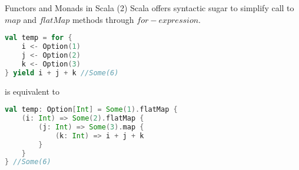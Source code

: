 \begin{frame}[fragile]{Functors and Monads in Scala (2)}
	Scala offers syntactic sugar to simplify call to $map$ and $flatMap$ methods through $for-expression$.
\begin{lstlisting}[language=scala]
val temp = for {
	i <- Option(1)
	j <- Option(2)
	k <- Option(3)
} yield i + j + k //Some(6)	
\end{lstlisting}	
	is equivalent to
\begin{lstlisting}[language=scala]
 val temp: Option[Int] = Some(1).flatMap { 
	(i: Int) => Some(2).flatMap { 
		(j: Int) => Some(3).map {
			(k: Int) => i + j + k
		}
	}
} //Some(6)	
\end{lstlisting}		
\end{frame}
